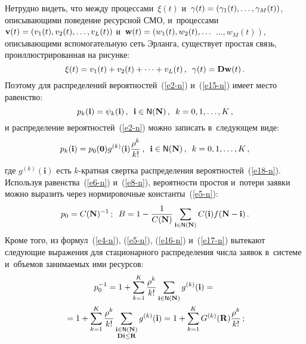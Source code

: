\begin{multicols}{2}
  Нетрудно видеть, что между процессами~$\xi(t)$ и~$\gamma(t)\hm= 
(\gamma_1(t), \ldots , \gamma_M(t))$, описыва\-ющи\-ми поведение ресурсной 
СМО, и~процессами $\mathbf{v}(t) \hm= (v_1(t), v_2(t), \ldots , v_L(t))$ 
и~$\mathbf{w}(t) \hm= \left(w_1(t), w_2(t), \ldots\right.$\linebreak 
$\left.\ldots, w_M(t)\right)$, описывающими 
вспомогательную сеть Эрланга, существует простая связь, 
проиллюстрированная на рисунке:
  \begin{equation*}
  \xi(t) =v_1(t)+v_2(t)+\cdots+ v_L(t)\,,\enskip \gamma(t)=\mathbf{Dw}(t)\,.
  \end{equation*}
    Поэтому для распределений вероятностей~(\ref{e2-n}) и~(\ref{e15-n}) имеет 
место равенство: 
  \begin{equation*}
  p_k(\mathbf{i}) =\psi_k(\mathbf{i})\,,\enskip \mathbf{i}\in{\sf 
N}(\mathbf{N})\,,\enskip k=0,1,\ldots ,K\,,
\end{equation*}
и распределение вероятностей~(\ref{e2-n}) можно записать в~следующем виде:
\begin{equation*}
p_k(\mathbf{i}) =p_0(\mathbf{0})g^{(k)} (\mathbf{i}) \displaystyle\frac{\displaystyle \rho^k\mathstrut}{\displaystyle k!\mathstrut}\,,\enskip 
\mathbf{i}\in{\sf N}(\mathbf{N})\,,\enskip k=0,1,\ldots, K\,,
\end{equation*}
где $g^{(k)}(\mathbf{i})$ есть $k$-крат\-ная свертка распределения 
вероятностей~(\ref{e18-n}). Используя равенства~(\ref{e6-n}) и~(\ref{e8-n}), 
вероятности простоя и~потери заявки можно выразить через нормировочные 
константы~(\ref{e5-n}):
\begin{equation*}
p_0=C(\mathbf{N})^{-1}\,;\enskip B=1-\displaystyle\frac{\displaystyle 1\mathstrut}{\displaystyle C(\mathbf{N})\mathstrut}
\sum\limits_{\mathbf{i}\in{\sf N}(\mathbf{N})} C(\mathbf{i}) f(\mathbf{N}-
\mathbf{i})\,.
\end{equation*}
Кроме того, из формул~(\ref{e4-n}), (\ref{e5-n}), (\ref{e16-n}) и~(\ref{e17-n}) 
вытекают следующие выражения для стационарного распределения числа 
заявок в~системе и~объемов занимаемых ими ресурсов:
\begin{multline*}
p_0^{-1} =1+\sum\limits_{k=1}^K \displaystyle\frac{\displaystyle \rho^k\mathstrut}{\displaystyle k!\mathstrut} \sum\limits_{\mathbf{i}\in{\sf 
N}(\mathbf{N})} g^{(k)}(\mathbf{i}) ={}\\
{}=1+\sum\limits_{k=1}^K \displaystyle\frac{\displaystyle \rho^k\mathstrut}{\displaystyle k!\mathstrut} 
\sum\limits_{\substack{{\mathbf{i}\in{\sf N}(\mathbf{N})}\\ {\mathbf{Di}\leq 
\mathbf{R}}}} g^{(k)} (\mathbf{i}) =1+ \sum\limits_{k=1}^K G^{(k)} 
(\mathbf{R}) \displaystyle\frac{\displaystyle \rho^k\mathstrut}{\displaystyle k!\mathstrut}\,;
\end{multline*}


\end{multicols}

